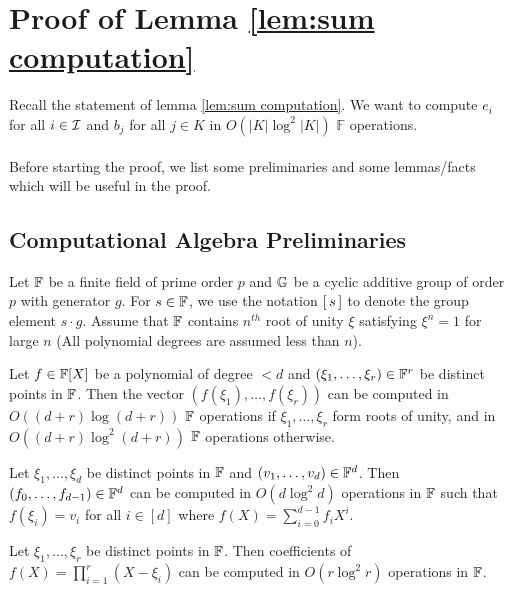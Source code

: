 \appendix
\section{Proof of Lemma \ref{lem:sum computation}}
Recall the statement of lemma \ref{lem:sum computation}. We want to compute $e_i$ for all $i \in \mathcal{I}$ and $b_j$ for all $j \in K$ in $O(|K|\log^2|K|)$ $\mathbb{F}$ operations.\\\\

Before starting the proof, we list some preliminaries and some lemmas/facts which will be useful in the proof.\\

\subsection{Computational Algebra Preliminaries}
Let $\mathbb{F}$ be a finite field of prime order $p$ and $\mathbb{G}$ be a cyclic additive group of order $p$ with generator $g$. For $s \in \mathbb{F}$, we use
the notation $[\,{s}\,]$ to denote the group element $s\cdot g$. Assume that $\mathbb{F}$ contains $n^{th}$ root of unity $\xi$
satisfying $\xi^n=1$ for large $n$ (All polynomial degrees are assumed less than $n$).

\begin{fact}\label{fc:fft}
Let $f\in \mathbb{F}[X]$ be a polynomial of degree $<d$ and $(\xi_1,\ldots,\xi_r)\in \mathbb{F}^r$ be distinct points in $\mathbb{F}$.
Then the vector $(f(\xi_1),\ldots,f(\xi_r))$ can be computed in $O((d+r)\log (d+r))$ $\mathbb{F}$ operations if $\xi_1,\ldots,\xi_r$ form roots
of unity, and in $O((d+r)\log^2(d+r))$ $\mathbb{F}$ operations otherwise.
\end{fact}

\begin{fact}\label{fc:ifft}
Let $\xi_1,\ldots,\xi_d$ be distinct points in $\mathbb{F}$ and $(v_1,\ldots,v_d)\in \mathbb{F}^d$. Then $(f_0,\ldots,f_{d-1})\in \mathbb{F}^d$
can be computed in $O(d\log^2 d)$ operations in $\mathbb{F}$ such that $f(\xi_i)=v_i$ for all $i\in [d]$ where
$f(X)=\sum_{i=0}^{d-1}f_iX^i$.
\end{fact}

\begin{fact}\label{fc:mult}
Let $\xi_1,\ldots,\xi_r$ be distinct points in $\mathbb{F}$. Then coefficients of $f(X)=\prod_{i=1}^r (X-\xi_i)$
can be computed in $O(r\log^2 r)$ operations in $\mathbb{F}$.
\end{fact}

